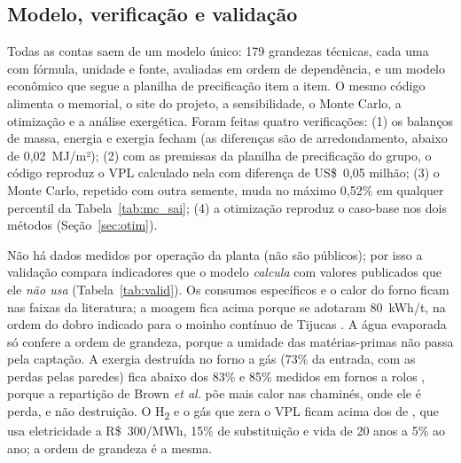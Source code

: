 \documentclass[10pt,a4paper,twocolumn]{article}
\newcommand{\Ht}{H\textsubscript{2}}
\begin{document}
\subsection{Modelo, verificação e validação}\label{sec:modelo}

Todas as contas saem de um modelo único: 179 grandezas técnicas, cada uma com fórmula, unidade e fonte, avaliadas em ordem de dependência, e um modelo econômico que segue a planilha de precificação item a item. O mesmo código alimenta o memorial, o site do projeto, a sensibilidade, o Monte Carlo, a otimização e a análise exergética. Foram feitas quatro verificações: (1) os balanços de massa, energia e exergia fecham (as diferenças são de arredondamento, abaixo de 0,02~MJ/m²); (2) com as premissas da planilha de precificação do grupo, o código reproduz o VPL calculado nela com diferença de US\$~0,05 milhão; (3) o Monte Carlo, repetido com outra semente, muda no máximo 0,52\% em qualquer percentil da Tabela~\ref{tab:mc_sai}; (4) a otimização reproduz o caso-base nos dois métodos (Seção~\ref{sec:otim}).

Não há dados medidos por operação da planta (não são públicos); por isso a validação compara indicadores que o modelo \textit{calcula} com valores publicados que ele \textit{não usa} (Tabela~\ref{tab:valid}). Os consumos específicos e o calor do forno ficam nas faixas da literatura; a moagem fica acima porque se adotaram 80~kWh/t, na ordem do dobro indicado para o moinho contínuo de Tijucas \cite{rigobelo2026}. A água evaporada só confere a ordem de grandeza, porque a umidade das matérias-primas não passa pela captação. A exergia destruída no forno a gás (73\% da entrada, com as perdas pelas paredes) fica abaixo dos 83\% e 85\% medidos em fornos a rolos \cite{ferrer2019,wang2020}, porque a repartição de Brown \textit{et al.} \cite{brown1996} põe mais calor nas chaminés, onde ele é perda, e não destruição. O \Ht{} e o gás que zera o VPL ficam acima dos de \cite{castineiras2025}, que usa eletricidade a R\$~300/MWh, 15\% de substituição e vida de 20 anos a 5\% ao ano; a ordem de grandeza é a mesma.
\end{document}
